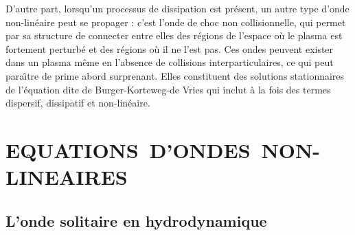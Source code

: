 \documentclass[10pt,thmsa]{article}
\begin{document}
D'autre part, lorsqu'un processus de dissipation est pr\'{e}sent, un autre
type d'onde non-lin\'{e}aire peut se propager : c'est l'onde de choc non
collisionnelle, qui permet par sa structure de connecter entre elles des
r\'{e}gions de l'espace o\`{u} le plasma est fortement perturb\'{e} et des
r\'{e}gions o\`{u} il ne l'est pas. Ces ondes peuvent exister dans un plasma
m\^{e}me en l'absence de collisions interparticulaires, ce qui peut
para\^{\i}tre de prime abord surprenant. Elles constituent des solutions
stationnaires de l'\'{e}quation dite de Burger-Korteweg-de Vries qui inclut
\`{a} la fois des termes dispersif, dissipatif et non-lin\'{e}aire.

\section{EQUATIONS\ D'ONDES\ NON-LINEAIRES}

\subsection{L'onde solitaire en hydrodynamique}
\end{document}
